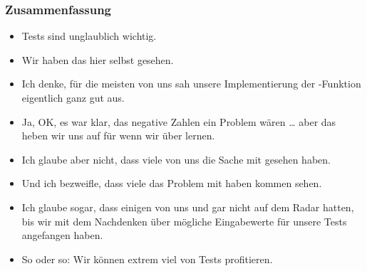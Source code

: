 \documentclass[aspectratio=169,mathserif,notheorems]{beamer}%
\begin{document}
%
\begin{frame}%
\frametitle{Zusammenfassung}%
\begin{itemize}%
%
\item Tests sind unglaublich wichtig.%
%
\item<2-> Wir haben das hier selbst gesehen.%
%
\item<3-> Ich denke, für die meisten von uns sah unsere Implementierung der -Funktion eigentlich ganz gut aus.%
%
\item<4-> Ja, OK, es war klar, das negative Zahlen ein Problem wären {\dots} aber das heben wir uns auf für wenn wir über  lernen.%
%
\item<5-> Ich glaube aber nicht, dass viele von uns die Sache mit  gesehen haben.%
%
\item<6-> Und ich bezweifle, dass viele das Problem mit  haben kommen sehen.%
%
\item<7-> Ich glaube sogar, dass einigen von uns  und  gar nicht auf dem Radar hatten, bis wir mit dem Nachdenken über mögliche Eingabewerte für unsere Tests angefangen haben.%
%
\item<8-> So oder so: Wir können extrem viel von Tests profitieren.%
%
\end{itemize}%
\end{frame}%
%
\endPresentation%
\end{document}
